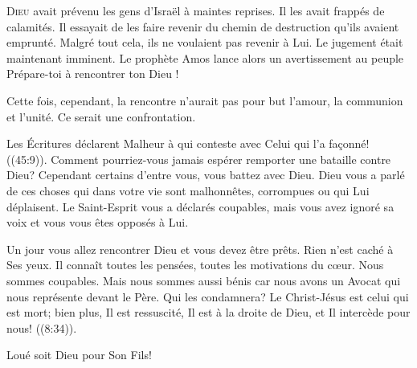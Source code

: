 \dvrule






\lettrine{D}{ieu} avait prévenu les gens d'Israël à maintes reprises.
 Il les avait frappés de calamités. Il essayait de les faire revenir
 du chemin de destruction qu'ils avaient emprunté.
 Malgré tout cela, ils ne voulaient pas revenir à Lui.
 Le jugement était maintenant imminent.
 Le prophète Amos lance alors un avertissement au peuple\frcolon{}
 \Og Prépare-toi à rencontrer ton Dieu ! \Fg{}

Cette fois, cependant, la rencontre n'aurait pas pour but l'amour,
 la communion et l'unité. Ce serait une confrontation. 


Les Écritures déclarent\frcolon{} 
 \Og Malheur à qui conteste avec Celui qui l'a fa\c{c}onné! \Fg{}
 ((45:9)).
 Comment pourriez-vous jamais espérer remporter une bataille contre Dieu?
 Cependant certains d'entre vous, vous battez avec Dieu.
 Dieu vous a parlé de ces choses qui dans votre vie sont malhonnêtes,
 corrompues ou qui Lui déplaisent. Le Saint-Esprit vous a déclarés coupables,
 mais vous avez ignoré sa voix et vous vous êtes opposés à Lui. 

Un jour vous allez rencontrer Dieu et vous devez être prêts.
 Rien n'est caché à Ses yeux. Il connaît toutes les pensées,
 toutes les motivations du c\oe{}ur. Nous sommes coupables.
 Mais nous sommes aussi bénis \ocadr car nous avons un Avocat qui nous
 représente devant le Père.
 \Og Qui les condamnera? Le Christ-Jésus est celui qui est mort;
 bien plus, Il est ressuscité, Il est à la droite de Dieu,
 et Il intercède pour nous! \Fg{} ((8:34)). 

Loué soit Dieu pour Son Fils! 

